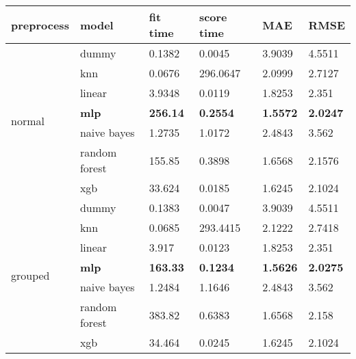 \begin{table}[H]
    \centering
    \begin{tabular}{ll|llll}
    \toprule
    \textbf{preprocess} & \textbf{model} & \textbf{fit time} & \textbf{score time} & \textbf{MAE} & \textbf{RMSE} \\
    \midrule
    \multirow{7}{*}{normal}   & dummy         & 0.1382          & 0.0045          & 3.9039          & 4.5511          \\
                              & knn           & 0.0676          & 296.0647        & 2.0999          & 2.7127          \\
                              & linear        & 3.9348          & 0.0119          & 1.8253          & 2.351           \\
                              & \textbf{mlp}  & \textbf{256.14} & \textbf{0.2554} & \textbf{1.5572} & \textbf{2.0247} \\
                              & naive bayes   & 1.2735          & 1.0172          & 2.4843          & 3.562           \\
                              & random forest & 155.85          & 0.3898          & 1.6568          & 2.1576          \\
                              & xgb           & 33.624          & 0.0185          & 1.6245          & 2.1024          \\
                              \midrule
    \multirow{7}{*}{grouped}  & dummy         & 0.1383          & 0.0047          & 3.9039          & 4.5511          \\
                              & knn           & 0.0685          & 293.4415        & 2.1222          & 2.7418          \\
                              & linear        & 3.917           & 0.0123          & 1.8253          & 2.351           \\
                              & \textbf{mlp}  & \textbf{163.33} & \textbf{0.1234} & \textbf{1.5626} & \textbf{2.0275} \\
                              & naive bayes   & 1.2484          & 1.1646          & 2.4843          & 3.562           \\
                              & random forest & 383.82          & 0.6383          & 1.6568          & 2.158           \\
                              & xgb           & 34.464          & 0.0245          & 1.6245          & 2.1024          \\

\end{tabular}
\end{table}
